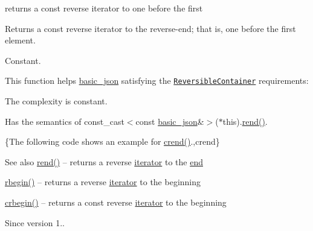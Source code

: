 returns a const reverse iterator to one before the first 

Returns a const reverse iterator to the reverse-\/end; that is, one before the first element.

  Constant.

This function helps {\ttfamily \hyperlink{classnlohmann_1_1basic__json}{basic\+\_\+json}} satisfying the \href{https://en.cppreference.com/w/cpp/named_req/ReversibleContainer}{\tt Reversible\+Container} requirements\+:
\begin{DoxyItemize}
\item The complexity is constant.
\item Has the semantics of {\ttfamily const\+\_\+cast$<$const \hyperlink{classnlohmann_1_1basic__json}{basic\+\_\+json}\&$>$($\ast$this).\hyperlink{classnlohmann_1_1basic__json_ac77aed0925d447744676725ab0b6d535}{rend()}}.
\end{DoxyItemize}

\{The following code shows an example for {\ttfamily \hyperlink{classnlohmann_1_1basic__json_a5795b029dbf28e0cb2c7a439ec5d0a88}{crend()}}.,crend\}

\begin{DoxySeeAlso}{See also}
\hyperlink{classnlohmann_1_1basic__json_ac77aed0925d447744676725ab0b6d535}{rend()} -- returns a reverse \hyperlink{classnlohmann_1_1basic__json_a099316232c76c034030a38faa6e34dca}{iterator} to the \hyperlink{classnlohmann_1_1basic__json_a13e032a02a7fd8a93fdddc2fcbc4763c}{end} 

\hyperlink{classnlohmann_1_1basic__json_a1ef93e2006dbe52667294f5ef38b0b10}{rbegin()} -- returns a reverse \hyperlink{classnlohmann_1_1basic__json_a099316232c76c034030a38faa6e34dca}{iterator} to the beginning 

\hyperlink{classnlohmann_1_1basic__json_a1e0769d22d54573f294da0e5c6abc9de}{crbegin()} -- returns a const reverse \hyperlink{classnlohmann_1_1basic__json_a099316232c76c034030a38faa6e34dca}{iterator} to the beginning
\end{DoxySeeAlso}
\begin{DoxySince}{Since}
version 1.. 
\end{DoxySince}
